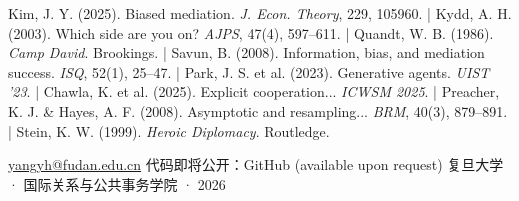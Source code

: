 \documentclass{article}
\begin{document}
\begin{minipage}[t]{841mm}
\begin{minipage}[t]{259mm}
{\fontsize{18}{26}\selectfont\raggedright%
Kim, J. Y. (2025). Biased mediation. \textit{J. Econ. Theory}, 229, 105960.
\;|\; Kydd, A. H. (2003). Which side are you on? \textit{AJPS}, 47(4), 597--611.
\;|\; Quandt, W. B. (1986). \textit{Camp David}. Brookings.
\;|\; Savun, B. (2008). Information, bias, and mediation success. \textit{ISQ}, 52(1), 25--47.
\;|\; Park, J. S. et al. (2023). Generative agents. \textit{UIST '23}.
\;|\; Chawla, K. et al. (2025). Explicit cooperation... \textit{ICWSM 2025}.
\;|\; Preacher, K. J. \& Hayes, A. F. (2008). Asymptotic and resampling... \textit{BRM}, 40(3), 879--891.
\;|\; Stein, K. W. (1999). \textit{Heroic Diplomacy}. Routledge.
\par}

\end{minipage}
\end{minipage}

\vspace*{\fill}
\colorbox{gold}{\begin{minipage}{841mm}\vspace{1.2mm}\end{minipage}}
\colorbox{fblue}{\begin{minipage}{841mm}
\vspace{6mm}\centering
{\fontsize{18}{24}\selectfont\sffamily\color{white}
 \href{mailto:yangyh@fudan.edu.cn}{yangyh@fudan.edu.cn}
 \hspace{3cm} 代码即将公开：GitHub (available upon request)
 \hspace{3cm} 复旦大学 · 国际关系与公共事务学院 · 2026}
\vspace{6mm}
\end{minipage}}
\end{document}
